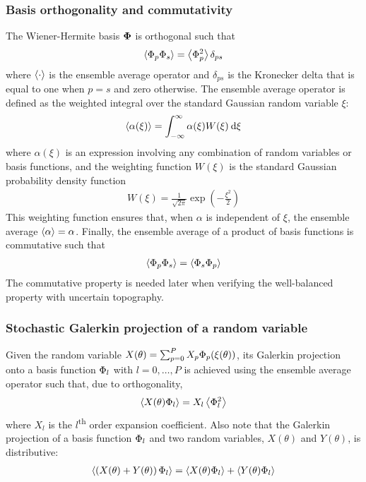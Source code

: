 \subsubsection*{Basis orthogonality and commutativity}
The Wiener-Hermite basis $\bm{\Phi}$ is orthogonal such that
\begin{align}
	\left\langle \Phi_p \Phi_s \right\rangle = \left\langle \Phi_p^2 \right\rangle \delta_{ps}
\end{align}
where $\left\langle \cdot \right\rangle$ is the ensemble average operator and $\delta_{ps}$ is the Kronecker delta that is equal to one when $p = s$ and zero otherwise.
The ensemble average operator is defined as the weighted integral over the standard Gaussian random variable $\xi$:
\begin{align}
	\left\langle \alpha(\xi) \right\rangle = \int_{-\infty}^\infty \alpha(\xi) W(\xi) \:\mathrm{d} \xi \label{eqn:ensemble-average}
\end{align}
where $\alpha(\xi)$ is an expression involving any combination of random variables or basis functions, and the weighting function $W(\xi)$ is the standard Gaussian probability density function
\begin{align}
	W(\xi) = \frac{1}{\sqrt{2\pi}} \exp \left(-\frac{\xi^2}{2}\right)
\end{align}
This weighting function ensures that, when $\alpha$ is independent of $\xi$, the ensemble average $\left\langle \alpha \right\rangle = \alpha$.
Finally, the ensemble average of a product of basis functions is commutative such that
\begin{align}
    \left\langle \Phi_p \Phi_s \right\rangle = \left\langle \Phi_s \Phi_p \right\rangle
    \label{eqn:commutative}
\end{align}
The commutative property is needed later when verifying the well-balanced property with uncertain topography.

\subsubsection*{Stochastic Galerkin projection of a random variable}
Given the random variable $X(\theta) = \sum_{p=0}^P X_p \Phi_p(\xi(\theta))$, its Galerkin projection onto a basis function $\Phi_l$ with $l = 0, \ldots, P$ is achieved using the ensemble average operator such that, due to orthogonality,
\begin{align}
	\left\langle X(\theta) \Phi_l \right\rangle = X_l \left\langle \Phi_l^2 \right\rangle \label{eqn:orthogonal}
\end{align}
where $X_l$ is the $l$\textsuperscript{th} order expansion coefficient.
Also note that the Galerkin projection of a basis function $\Phi_l$ and two random variables, $X(\theta)$ and $Y(\theta)$, is distributive:
\begin{align}
	\left\langle \left(X(\theta) + Y(\theta)\right) \Phi_l \right\rangle
	=
	\left\langle X(\theta) \Phi_l \right\rangle + \left\langle Y(\theta) \Phi_l \right\rangle \label{eqn:distributive}
\end{align}

